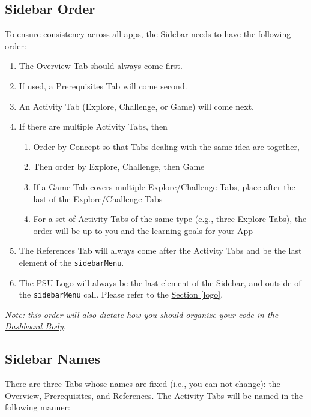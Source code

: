 \documentclass[
]{book}
\providecommand{\tightlist}{%
  \setlength{\itemsep}{0pt}\setlength{\parskip}{0pt}}
\begin{document}
\hypertarget{sidebar-order}{%
\subsection{Sidebar Order}\label{sidebar-order}}

To ensure consistency across all apps, the Sidebar needs to have the following order:

\begin{enumerate}
\def\labelenumi{\arabic{enumi}.}
\tightlist
\item
  The Overview Tab should always come first.
\item
  If used, a Prerequisites Tab will come second.
\item
  An Activity Tab (Explore, Challenge, or Game) will come next.
\item
  If there are multiple Activity Tabs, then

  \begin{enumerate}
  \def\labelenumii{\alph{enumii}.}
  \tightlist
  \item
    Order by Concept so that Tabs dealing with the same idea are together,
  \item
    Then order by Explore, Challenge, then Game
  \item
    If a Game Tab covers multiple Explore/Challenge Tabs, place after the last of the Explore/Challenge Tabs
  \item
    For a set of Activity Tabs of the same type (e.g., three Explore Tabs), the order will be up to you and the learning goals for your App
  \end{enumerate}
\item
  The References Tab will always come after the Activity Tabs and be the last element of the \texttt{sidebarMenu}.
\item
  The PSU Logo will always be the last element of the Sidebar, and outside of the \texttt{sidebarMenu} call. Please refer to the \protect\hyperlink{logo}{Section \ref{logo}}.
\end{enumerate}

\emph{Note: this order will also dictate how you should organize your code in the \protect\hyperlink{body}{Dashboard Body}.}

\hypertarget{sidebar-names}{%
\subsection{Sidebar Names}\label{sidebar-names}}

There are three Tabs whose names are fixed (i.e., you can not change): the Overview, Prerequisites, and References. The Activity Tabs will be named in the following manner:
\end{document}
